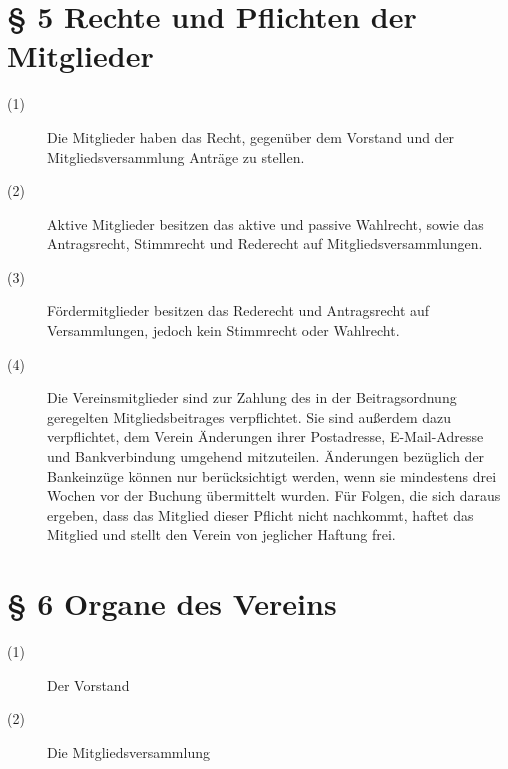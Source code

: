 \documentclass[a4paper,12pt]{scrartcl}
\begin{document}
\section*{\S{} 5 Rechte und Pflichten der Mitglieder}
\begin{description} 

\item[(1)] Die Mitglieder haben das Recht, gegenüber dem Vorstand und der Mitgliedsversammlung Anträge zu stellen.
\item[(2)] Aktive Mitglieder besitzen das aktive und passive Wahlrecht, sowie das Antragsrecht, Stimmrecht und Rederecht auf Mitgliedsversammlungen.
\item[(3)] Fördermitglieder besitzen das Rederecht und Antragsrecht auf Versammlungen, jedoch kein Stimmrecht oder Wahlrecht.
\item[(4)] Die Vereinsmitglieder sind zur Zahlung des in der Beitragsordnung geregelten Mitgliedsbeitrages verpflichtet. Sie sind außerdem dazu verpflichtet, dem Verein Änderungen ihrer Postadresse, E-Mail-Adresse und Bankverbindung umgehend mitzuteilen. Änderungen bezüglich der Bankeinzüge können nur berücksichtigt werden, wenn sie mindestens drei Wochen vor der Buchung übermittelt wurden. Für Folgen, die sich daraus ergeben, dass das Mitglied dieser Pflicht nicht nachkommt, haftet das Mitglied und stellt den Verein von jeglicher Haftung frei.

\end{description}



\section*{\S{} 6 Organe des Vereins}
\begin{description} 

\item[(1)] Der Vorstand
\item[(2)] Die Mitgliedsversammlung

\end{description}
\end{document}
